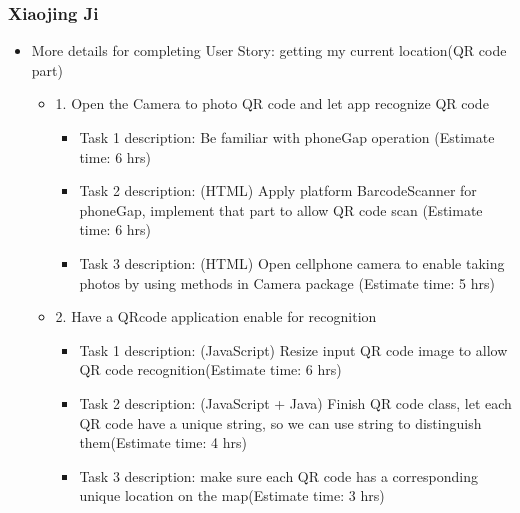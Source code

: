 \documentclass[12pt]{article}
\begin{document}
\subsubsection*{Xiaojing Ji}
\begin{itemize}
\item More details for completing User Story: getting my current location(QR code part)

  \begin{itemize}
         \item 1. Open the Camera to photo QR code and let app recognize QR code

	  \begin{itemize}  
	    \renewcommand{\labelitemii}{-}
	     \item Task 1 description: Be familiar with phoneGap operation (Estimate time: 6 hrs)
	     \item Task 2 description: (HTML) Apply platform BarcodeScanner for phoneGap, implement that part to allow QR code scan (Estimate time: 6 hrs)
	     \item Task 3 description: (HTML) Open cellphone camera to enable taking photos by using methods in Camera package (Estimate time: 5 hrs)
	\end{itemize}

         \item 2. Have a QRcode application enable for recognition

	\begin{itemize}
	  \renewcommand{\labelitemii}{-}
   	   \item Task 1 description: (JavaScript) Resize input QR code image to allow QR code recognition(Estimate time: 6 hrs) 
	   \item Task 2 description: (JavaScript + Java) Finish QR code class, let each QR code have a unique string, so we can use string to distinguish them(Estimate time: 4 hrs)
   \item Task 3 description: make sure each QR code has a corresponding unique location on the map(Estimate time: 3 hrs)
	\end{itemize}

   \end{itemize}

\end{itemize}
\end{document}
